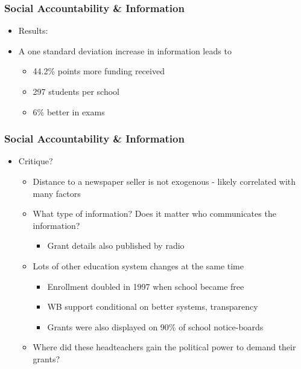 \documentclass[xcolor=x11names,compress]{beamer}\usepackage[]{graphicx}\usepackage[]{color}
\renewcommand{\(}{\begin{columns}}
\renewcommand{\)}{\end{columns}}
\newcommand{\<}[1]{\begin{column}{#1}}
\renewcommand{\>}{\end{column}}
\begin{document}
\begin{frame}
\frametitle{Social Accountability \& Information}
\begin{itemize}
\item Results:
\pause
\item A one standard deviation increase in information leads to 
\begin{itemize}
\item 44.2\% points more funding received
\item 297 students per school
\item 6\% better in exams
\end{itemize}
\end{itemize}
\end{frame}

\begin{frame}
\frametitle{Social Accountability \& Information}
\begin{itemize}
\item Critique?
\pause
\begin{itemize}
\item Distance to a newspaper seller is not exogenous - likely correlated with many factors
\pause
\item What type of information? Does it matter who communicates the information?
\begin{itemize}
\item Grant details also published by radio
\pause
\end{itemize}
\item Lots of other education system changes at the same time
\begin{itemize}
\item Enrollment doubled in 1997 when school became free
\item WB support conditional on better systems, transparency
\item Grants were also displayed on 90\% of school notice-boards
\pause
\end{itemize}
\item Where did these headteachers gain the political power to demand their grants?
\end{itemize}
\end{itemize}
\end{frame}
\end{document}
